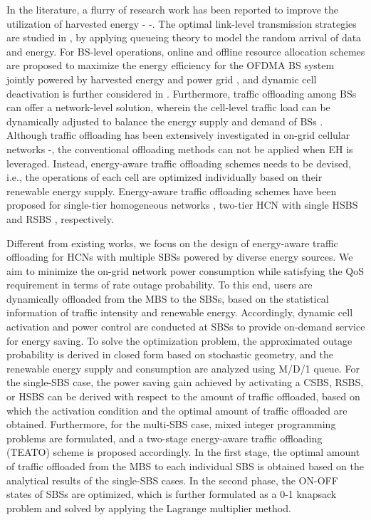 \documentclass[12pt, draftclsnofoot,onecolumn]{IEEEtran}
\begin{document}
In the literature, a flurry of research work has been reported to improve the utilization of harvested energy \cite{EH_single_link_2}-\cite{Sheng_EH_sleep} \cite{Tao_ICE_long}-\cite{mine_GC_EH}.
The optimal link-level transmission strategies are studied in \cite{EH_single_link_2}, by applying queueing theory to model the random arrival of data and energy.
For BS-level operations, online and offline resource allocation schemes are proposed to maximize the energy efficiency for the OFDMA BS system jointly powered by harvested energy and power grid \cite{Derrick_single_BS_OFDMA}, and dynamic cell deactivation is further considered in \cite{Sheng_EH_sleep}.
Furthermore, traffic offloading among BSs can offer a network-level solution, wherein the cell-level traffic load can be dynamically adjusted to balance the energy supply and demand of BSs \cite{Tao_Magazine_RE} \cite{Zhongming}.
Although traffic offloading has been extensively investigated in on-grid cellular networks \cite{QYe_offloading}-\cite{EE_offloading_learning_JSAC}, the conventional offloading methods can not be applied when EH is leveraged. 
Instead, energy-aware traffic offloading schemes needs to be devised, i.e., the operations of each cell are optimized individually based on their renewable energy supply.
Energy-aware traffic offloading schemes have been proposed for single-tier homogeneous networks \cite{Tao_ICE_long} \cite{JGong_TC}, two-tier HCN with single HSBS \cite{BUPT_conf_Het_RE} and RSBS \cite{mine_GC_EH}, respectively.

Different from existing works, we focus on the design of energy-aware traffic offloading for HCNs with multiple SBSs powered by diverse energy sources.
We aim to minimize the on-grid network power consumption while satisfying the QoS requirement in terms of rate outage probability.
To this end, users are dynamically offloaded from the MBS to the SBSs, based on the statistical information of traffic intensity and renewable energy.
Accordingly, dynamic cell activation and power control are conducted at SBSs to provide on-demand service for energy saving.
To solve the optimization problem, the approximated outage probability is derived in closed form based on stochastic geometry, and the renewable energy supply and consumption are analyzed using M/D/1 queue.
For the single-SBS case, the power saving gain achieved by activating a CSBS, RSBS, or HSBS can be derived with respect to the amount of traffic offloaded, based on which the activation condition and the optimal amount of traffic offloaded are obtained.
Furthermore, for the multi-SBS case, mixed integer programming problems are formulated, and a two-stage energy-aware traffic offloading (TEATO) scheme is proposed accordingly.
In the first stage, the optimal amount of traffic offloaded from the MBS to each individual SBS is obtained based on the analytical results of the single-SBS cases.
In the second phase, the ON-OFF states of SBSs are optimized, which is further formulated as a 0-1 knapsack problem and solved by applying the Lagrange multiplier method.
\end{document}
